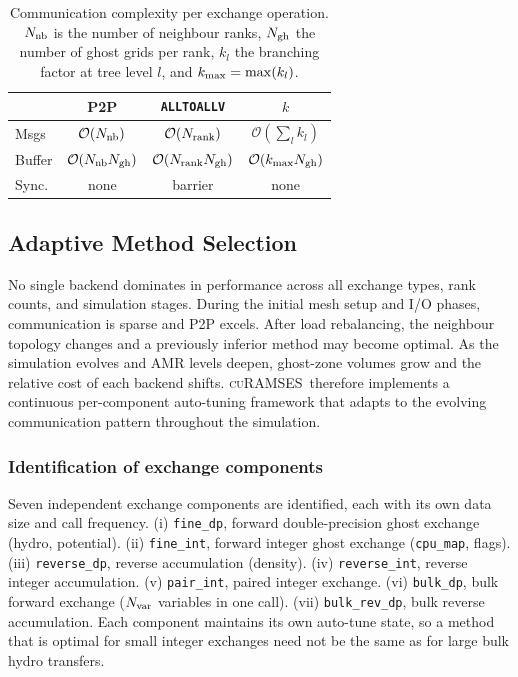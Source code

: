 \documentclass[fleqn,usenatbib]{mnras}
\newcommand{\curamses}{\textsc{cuRAMSES}}
\newcommand{\nrank}{N_{\rm rank}}
\newcommand{\ksec}{\ensuremath{k}\text{-section}}
\newcommand{\Olog}[1]{\mathcal{O}(#1)}
\newcommand{\code}[1]{\texttt{#1}}
\begin{document}
\begin{table}
\centering
\caption{Communication complexity per exchange operation.
$N_{\rm nb}$ is the number of neighbour ranks,
$N_{\rm gh}$ the number of ghost grids per rank,
$k_l$ the branching factor at tree level $l$, and
$k_{\rm max} = \max(k_l)$.}
\label{tab:complexity}
\begin{tabular}{lccc}
\toprule
& P2P & \code{ALLTOALLV} & \ksec \\
\midrule
Msgs   & $\Olog{N_{\rm nb}}$          & $\Olog{\nrank}$                        & $\Olog{\sum_l k_l}$ \\
Buffer & $\Olog{N_{\rm nb} N_{\rm gh}}$ & $\Olog{\nrank N_{\rm gh}}$           & $\Olog{k_{\rm max} N_{\rm gh}}$ \\
Sync.  & none                    & barrier                      & none \\
\bottomrule
\end{tabular}
\end{table}


\subsection{Adaptive Method Selection}
\label{sec:autotune}

No single backend dominates in performance across all exchange types, rank counts,
and simulation stages. During the initial mesh setup and I/O phases,
communication is sparse and P2P excels. After load rebalancing, the
neighbour topology changes and a previously inferior method may become
optimal. As the simulation evolves and AMR levels deepen, ghost-zone
volumes grow and the relative cost of each backend shifts.
\curamses\ therefore implements a continuous per-component auto-tuning
framework that adapts to the evolving communication pattern throughout
the simulation.

\subsubsection{Identification of exchange components}
\label{sec:autotune_components}

Seven independent exchange components are identified, each with its
own data size and call frequency.
(i) \code{fine\_dp}, forward double-precision ghost exchange (hydro,
potential).
(ii) \code{fine\_int}, forward integer ghost exchange (\code{cpu\_map},
flags).
(iii) \code{reverse\_dp}, reverse accumulation (density).
(iv) \code{reverse\_int}, reverse integer accumulation.
(v) \code{pair\_int}, paired integer exchange.
(vi) \code{bulk\_dp}, bulk forward exchange ($N_{\rm var}$ variables
in one call).
(vii) \code{bulk\_rev\_dp}, bulk reverse accumulation.
Each component maintains its own auto-tune state, so a method that is
optimal for small integer exchanges need not be the same as for large
bulk hydro transfers.
\end{document}
